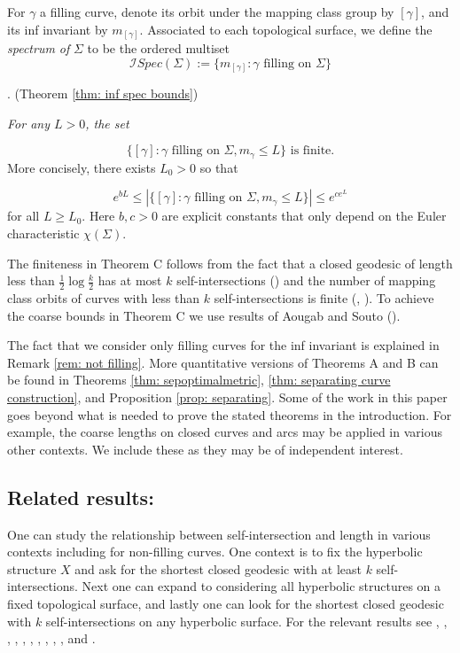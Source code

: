 \documentclass[12pt]{amsart}
\numberwithin{equation}{section}
\theoremstyle{plain}
\begin{document}
 
For $\gamma$ a filling curve, denote its orbit under the mapping class group  by $[\gamma]$, and 
its inf invariant by   $m_{[\gamma]}$. Associated to each topological surface,  we
 define the {\it {}  spectrum of } $\Sigma$  to be
the ordered multiset
$$
 \mathcal{I}Spec (\Sigma) := \{m_{[\gamma]}: \gamma \text{ filling on } \Sigma \}
 $$

 \vskip5pt 

. (Theorem \ref{thm: inf spec bounds})
  {\it  For any $L>0$, the set

$$\{ [\gamma]:\gamma \text{ filling on }\Sigma, m_{\gamma}\leq L \}  \text{ is finite.}$$
 More concisely,   there exists $L_{0}>0$ so that 

$$
e^{bL}
\leq
|\{ [\gamma]:\gamma \text{ filling on }\Sigma,m_{\gamma}\leq L \}|
\leq e^{ce^{L}} 
$$
for all $L \geq L_{0}$. Here $b, c >0$ are  explicit constants that only depend on the Euler characteristic $\chi(\Sigma)$.}

\vskip5pt
 
The finiteness in Theorem  C follows  from the fact that a closed geodesic  of length less than  $\frac{1}{2} \log{\frac{k}{2}}$ has  at most  $k$ self-intersections   
(\cite{basmajian2013universal}) and 
the  number of  mapping class orbits of curves with less than $k$ self-intersections is finite  
(\cite{cahn2018mapping}, \cite{sapir2016orbitsnonsimpleclosedcurves}).  To achieve the coarse bounds in Theorem C we use  results of Aougab and Souto  (\cite{souto2018counting}).

The fact that we consider only filling curves for the inf invariant is explained in Remark \ref{rem: not filling}. More quantitative versions of Theorems A and B  can be found in 
 Theorems \ref{thm: sepoptimalmetric}, \ref{thm: separating curve construction}, and Proposition \ref{prop: separating}. Some of the work in this paper goes beyond what is needed to prove the stated theorems in the introduction. For example, the coarse lengths on closed curves and arcs may be applied in various other contexts. We include these as they may be of independent interest. 

\subsection{Related results:}  
One can study  the relationship  between self-intersection  and length in various contexts including for non-filling curves.  One context is to fix the hyperbolic structure $X$ and ask for  the shortest closed geodesic with at least $k$ self-intersections. Next one can expand to considering all hyperbolic structures on a fixed topological surface, and lastly one can look for the shortest closed geodesic with $k$  self-intersections on any hyperbolic surface. For the relevant results see  
\cite{basmajianstable}, \cite{basmajian2013universal}, 
\cite{basmajian2017geometric}, 
\cite{cahn2018mapping},
\cite{ChasPhillipsoncepunctured}, \cite{Chasphillipstwice}, \cite{erlandsson2020short}, \cite{Gillmankeenwordsequences}, \cite{Malesteinputnam}, \cite{sapir2016boundnonsimp}, \cite{sertan} and \cite{torkaman2024intersectionpointsclosedgeodesics}.
\end{document}

